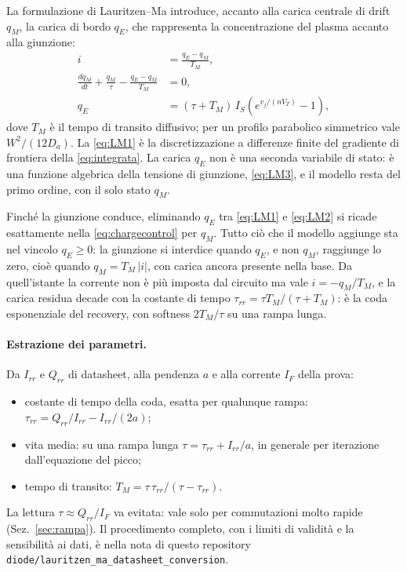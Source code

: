 \documentclass[11pt,a4paper]{article}
\begin{document}
La formulazione di Lauritzen--Ma introduce, accanto alla carica centrale di drift
$q_M$, la carica di bordo $q_E$, che rappresenta la concentrazione del plasma accanto
alla giunzione:
\begin{align}
  i &= \frac{q_E - q_M}{T_M}, \label{eq:LM1}\\
  \frac{dq_M}{dt} + \frac{q_M}{\tau} - \frac{q_E - q_M}{T_M} &= 0, \label{eq:LM2}\\
  q_E &= (\tau + T_M)\, I_S \left(e^{v_j/(nV_T)} - 1\right) , \label{eq:LM3}
\end{align}
dove $T_M$ \`e il tempo di transito diffusivo; per un profilo parabolico simmetrico
vale $W^2/(12 D_a)$. La \eqref{eq:LM1} \`e la discretizzazione a differenze finite del
gradiente di frontiera della \eqref{eq:integrata}. La carica $q_E$ non \`e una seconda
variabile di stato: \`e una funzione algebrica della tensione di giunzione,
\eqref{eq:LM3}, e il modello resta del primo ordine, con il solo stato $q_M$.

Finch\'e la giunzione conduce, eliminando $q_E$ tra \eqref{eq:LM1} e \eqref{eq:LM2} si
ricade esattamente nella \eqref{eq:chargecontrol} per $q_M$. Tutto ci\`o che il modello
aggiunge sta nel vincolo $q_E \geq 0$: la giunzione si interdice quando $q_E$, e non
$q_M$, raggiunge lo zero, cio\`e quando $q_M = T_M\,|i|$, con carica ancora presente
nella base. Da quell'istante la corrente non \`e pi\`u imposta dal circuito ma vale
$i = -q_M/T_M$, e la carica residua decade con la costante di tempo
$\tau_{rr} = \tau T_M/(\tau + T_M)$: \`e la coda esponenziale del recovery, con softness
$2T_M/\tau$ su una rampa lunga.

\paragraph{Estrazione dei parametri.} Da $I_{rr}$ e $Q_{rr}$ di datasheet, alla
pendenza $a$ e alla corrente $I_F$ della prova:
\begin{itemize}
  \item costante di tempo della coda, esatta per qualunque rampa:
        $\tau_{rr} = Q_{rr}/I_{rr} - I_{rr}/(2a)$;
  \item vita media: su una rampa lunga $\tau = \tau_{rr} + I_{rr}/a$, in generale
        per iterazione dall'equazione del picco;
  \item tempo di transito: $T_M = \tau\,\tau_{rr}/(\tau - \tau_{rr})$.
\end{itemize}
La lettura $\tau \approx Q_{rr}/I_F$ va evitata: vale solo per commutazioni molto
rapide (Sez.~\ref{sec:rampa}). Il procedimento completo, con i limiti di
validit\`a e la sensibilit\`a ai dati, \`e nella nota di questo repository
\texttt{diode/lauritzen\_ma\_datasheet\_\allowbreak conversion}.
\end{document}
